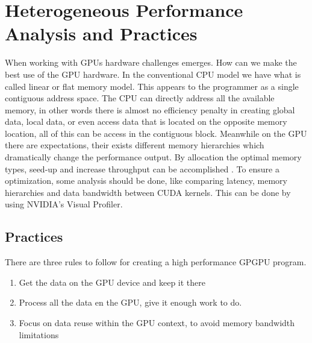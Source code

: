 
\chapter{Heterogeneous Performance Analysis and Practices} %

\label{Heterogeneous Performance Analysis and Practices} %



When working with GPUs hardware challenges emerges. How can we make the best use of the GPU hardware. In the conventional CPU model we have what is called linear or flat memory model. This appears to the programmer as a single contiguous address space. The CPU can directly address all the available memory, in other words there is almost no efficiency penalty in creating global data, local data, or even access data that is located on the opposite memory location, all of this can be access in the contiguous block. \cite{cook} Meanwhile on the GPU there are expectations, their exists different memory hierarchies which dramatically change the performance output. By allocation the optimal memory types, seed-up and increase throughput can be accomplished . To ensure a optimization, some analysis should be done, like comparing latency, memory hierarchies and data bandwidth between CUDA kernels. This can be done by using NVIDIA's Visual Profiler.


\section{Practices}


There are three rules to follow for creating a high performance GPGPU program.\cite{design}

\begin{enumerate}
  \item Get the data on the GPU device and keep it there
  \item Process all the data en the GPU, give it enough work to do.
  \item Focus on data reuse within the GPU context, to avoid memory bandwidth limitations
\end{enumerate}

